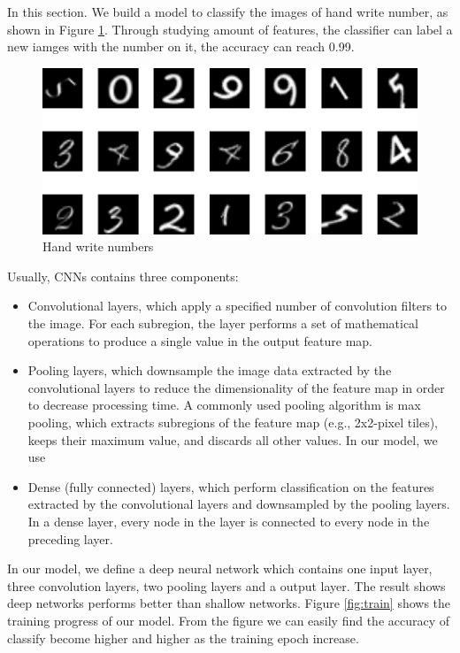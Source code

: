 In this section. We build a model to classify the images of hand write number, as shown in Figure \ref{fig:number}. Through studying amount of features, the classifier can label a new iamges with the number on it, the accuracy can reach 0.99.

\begin{figure}[h!]
	\centering
	\includegraphics[width=0.8\linewidth]{figures/part3/number}
	\caption{Hand write numbers}
	\label{fig:number}
\end{figure} 

Usually, CNNs contains three components:
\begin{itemize}
	\item Convolutional layers, which apply a specified number of convolution filters to the image. For each subregion, the layer performs a set of mathematical operations to produce a single value in the output feature map.
	\item Pooling layers, which downsample the image data extracted by the convolutional layers to reduce the dimensionality of the feature map in order to decrease processing time. A commonly used pooling algorithm is max pooling, which extracts subregions of the feature map (e.g., 2x2-pixel tiles), keeps their maximum value, and discards all other values. In our model, we use 
	\item Dense (fully connected) layers, which perform classification on the features extracted by the convolutional layers and downsampled by the pooling layers. In a dense layer, every node in the layer is connected to every node in the preceding layer.
\end{itemize}

In our model, we define a deep neural network which contains one input layer, three convolution layers, two pooling layers and a output layer. The result shows deep networks performs better than shallow networks. Figure \ref{fig:train} shows the training progress of our model. From the figure we can easily find the accuracy of classify become higher and higher as the training epoch increase.

